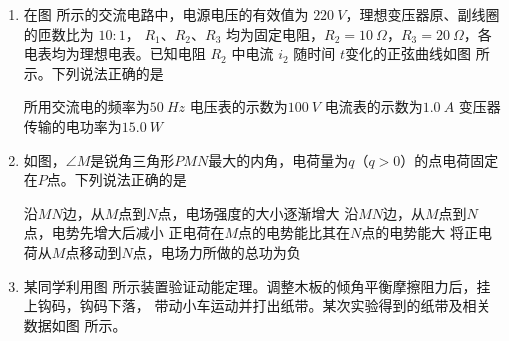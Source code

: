 \begin{enumerate}
\item
在图  所示的交流电路中，电源电压的有效值为 $ 220 \ V $，理想变压器原、副线圈的匝数比为 $ 10:1 $，
$ R_{1} $、$ R_{2} $、$ R_{3} $ 均为固定电阻，$ R_{2} =10 \ \Omega $，$ R_{3} =20 \ \Omega $，各电表均为理想电表。已知电阻 $ R_{2} $ 中电流 $ i_{2} $ 随时间 $ t $变化的正弦曲线如图  所示。下列说法正确的是  
\begin{figure}[h!]
\centering
\begin{subfigure}{0.4\linewidth}
\centering
 
\caption{}\label{2020:全国3:7a}
\end{subfigure}
\hfil
\begin{subfigure}{0.4\linewidth}
\centering
 
\caption{}\label{2020:全国3:7b}
\end{subfigure}
\end{figure}


\fourchoices
{所用交流电的频率为$ 50 \ Hz $}
{电压表的示数为$ 100 \ V $}
{电流表的示数为$ 1.0 \ A $}
{变压器传输的电功率为$ 15.0 \ W $}




\item
如图，$ \angle M $是锐角三角形$ PMN $最大的内角，电荷量为$ q $（$ q>0 $）的点电荷固定在$ P $点。下列说法正确的是  
\begin{figure}[h!]
\centering

\end{figure}


\fourchoices
{沿$ MN $边，从$ M $点到$ N $点，电场强度的大小逐渐增大}
{沿$ MN $边，从$ M $点到$ N $点，电势先增大后减小}
{正电荷在$ M $点的电势能比其在$ N $点的电势能大}
{将正电荷从$ M $点移动到$ N $点，电场力所做的总功为负}





\gaokaosy

\item
某同学利用图  所示装置验证动能定理。调整木板的倾角平衡摩擦阻力后，挂上钩码，钩码下落，
带动小车运动并打出纸带。某次实验得到的纸带及相关数据如图  所示。
\begin{figure}[h!]
\centering
\begin{subfigure}{0.4\linewidth}
\centering
 
\caption{}\label{2020:全国3:9a}
\end{subfigure}
\hfil
\begin{subfigure}{0.53\linewidth}
\centering
 
\caption{}\label{2020:全国3:9b}
\end{subfigure}
\end{figure}


\end{enumerate}
